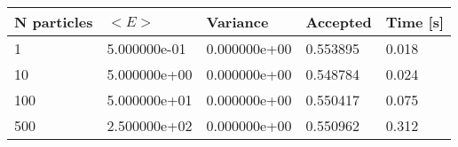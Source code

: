 \begin{table}[h!]
\begin{tabular}{|l|l|l|l|l|}
\hline 
N particles & $<E>$ & Variance & Accepted & Time [s]\\ 
 \hline 
1 & 5.000000e-01 & 0.000000e+00 & 0.553895 & 0.018 \\ \hline 
10 & 5.000000e+00 & 0.000000e+00 & 0.548784 & 0.024 \\ \hline 
100 & 5.000000e+01 & 0.000000e+00 & 0.550417 & 0.075 \\ \hline 
500 & 2.500000e+02 & 0.000000e+00 & 0.550962 & 0.312 \\ \hline 
\end{tabular}
\label{tab:ha1} 
\end{table} 
